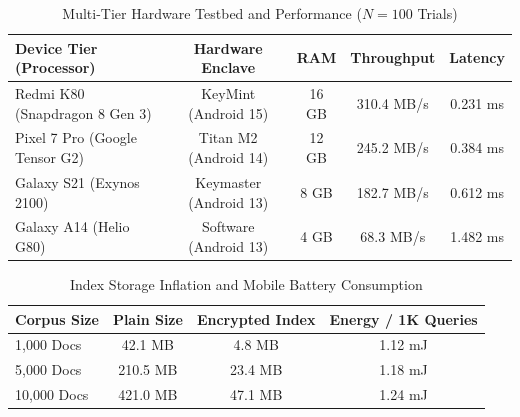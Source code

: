 \documentclass[10pt,conference]{IEEEtran}
\newenvironment{revised}{\color{revcolor}}{}
\begin{document}
\begin{revised}
\begin{table}[t]
\centering
\caption{Multi-Tier Hardware Testbed and Performance ($N=100$ Trials)}
\label{tab:testbed_perf}
\scriptsize
\setlength{\tabcolsep}{2.5pt}
\renewcommand{\arraystretch}{1.05}
\begin{tabular}{lcccc}
\toprule
\textbf{Device Tier (Processor)} & \textbf{Hardware Enclave} & \textbf{RAM} & \textbf{Throughput} & \textbf{Latency} \\
\midrule
Redmi K80 (Snapdragon 8 Gen 3) & KeyMint (Android 15) & 16 GB & 310.4 MB/s & 0.231 ms \\
Pixel 7 Pro (Google Tensor G2) & Titan M2 (Android 14) & 12 GB & 245.2 MB/s & 0.384 ms \\
Galaxy S21 (Exynos 2100) & Keymaster (Android 13) & 8 GB & 182.7 MB/s & 0.612 ms \\
Galaxy A14 (Helio G80) & Software (Android 13) & 4 GB & 68.3 MB/s & 1.482 ms \\
\bottomrule
\end{tabular}
\end{table}

\begin{table}[t]
\centering
\caption{Index Storage Inflation and Mobile Battery Consumption}
\label{tab:storage_energy}
\scriptsize
\setlength{\tabcolsep}{4pt}
\begin{tabular}{lccc}
\toprule
\textbf{Corpus Size} & \textbf{Plain Size} & \textbf{Encrypted Index} & \textbf{Energy / 1K Queries} \\
\midrule
1,000 Docs & 42.1 MB & 4.8 MB & 1.12 mJ \\
5,000 Docs & 210.5 MB & 23.4 MB & 1.18 mJ \\
10,000 Docs & 421.0 MB & 47.1 MB & 1.24 mJ \\
\bottomrule
\end{tabular}
\end{table}


\end{revised}
\end{document}

